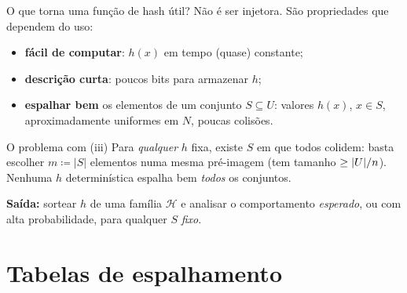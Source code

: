 \documentclass[aspectratio=169,11pt]{beamer}
\begin{document}
\begin{frame}{O que torna uma função de hash útil?}
  Não é ser injetora. São propriedades que dependem do uso:
  \begin{itemize}
  \item[\textbf{(i)}] \textbf{fácil de computar}: $h(x)$ em tempo (quase) constante;
  \item[\textbf{(ii)}] \textbf{descrição curta}: poucos bits para armazenar $h$;
  \item[\textbf{(iii)}] \textbf{espalhar bem} os elementos de um conjunto $S\subseteq U$:
    valores $h(x)$, $x\in S$, aproximadamente uniformes em $N$, poucas colisões.
  \end{itemize}
  \pause
  \vspace{0.5em}
  \begin{alertblock}{O problema com (iii)}
    Para \emph{qualquer} $h$ fixa, existe $S$ em que todos colidem:
    basta escolher $m \coloneqq |S|$ elementos numa mesma pré-imagem
    (tem tamanho $\ge\lvert U\rvert/n$).  Nenhuma $h$ determinística espalha
    bem \emph{todos} os conjuntos.
  \end{alertblock}
  \pause
  \textbf{Saída:} sortear $h$ de uma família $\mathcal H$ e analisar o
  comportamento \emph{esperado}, ou com alta probabilidade, para qualquer $S$
  \emph{fixo}.
\end{frame}

\section{Tabelas de espalhamento}
\end{document}
